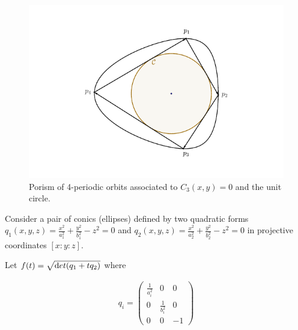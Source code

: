 \begin{figure}[H]
\begin{center}
\includegraphics[scale=0.7]{chap_02/pics/pics_02_030_C3C2.pdf}
\end{center}
\caption{Porism of 4-periodic orbits associated to $C_3(x,y)=0$ and the unit circle. }
\label{fig:C3C2}
\end{figure}

Consider a pair of conics (ellipses) defined by two quadratic forms $q_1(x,y,z)=\frac{x^2}{a_1^2}+\frac{y^2}{b_1^2}-z^2=0$ and $q_2(x,y,z)=\frac{x^2}{a_2^2}+\frac{y^2}{b_2^2}-z^2=0$ in projective coordinates $[x:y:z]$.

Let $f(t)=\sqrt{{\text det} (q_1+tq_2)}$ where

\begin{align*}
 q_i= \left(\begin{matrix}\frac{1}{a_i^2} &0 &0 \\
0 &\frac{1}{b_i^2} &0\\
0 & 0 &-1
\end{matrix}\right)
\end{align*}
